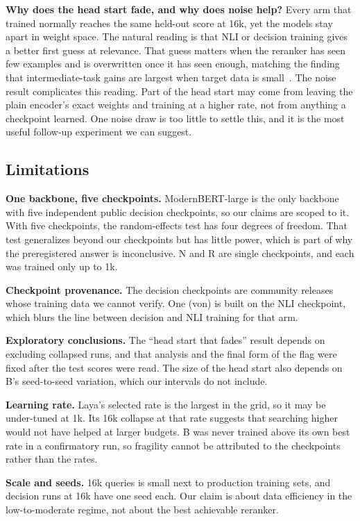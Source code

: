 \documentclass[journal]{IEEEtran}
\begin{document}
\textbf{Why does the head start fade, and why does noise help?} Every arm that trained normally reaches the same held-out score at 16k, yet the models stay apart in weight space. The natural reading is that NLI or decision training gives a better first guess at relevance. That guess matters when the reranker has seen few examples and is overwritten once it has seen enough, matching the finding that intermediate-task gains are largest when target data is small~\cite{phang2018stilts,pruksachatkun2020intermediate,mokrii2021transfer}. The noise result complicates this reading. Part of the head start may come from leaving the plain encoder's exact weights and training at a higher rate, not from anything a checkpoint learned. One noise draw is too little to settle this, and it is the most useful follow-up experiment we can suggest.

\subsection{Limitations}

\textbf{One backbone, five checkpoints.} ModernBERT-large is the only backbone with five independent public decision checkpoints, so our claims are scoped to it. With five checkpoints, the random-effects test has four degrees of freedom. That test generalizes beyond our checkpoints but has little power, which is part of why the preregistered answer is inconclusive. N and R are single checkpoints, and each was trained only up to 1k.

\textbf{Checkpoint provenance.} The decision checkpoints are community releases whose training data we cannot verify. One (von) is built on the NLI checkpoint, which blurs the line between decision and NLI training for that arm.

\textbf{Exploratory conclusions.} The ``head start that fades'' result depends on excluding collapsed runs, and that analysis and the final form of the flag were fixed after the test scores were read. The size of the head start also depends on B's seed-to-seed variation, which our intervals do not include.

\textbf{Learning rate.} Laya's selected rate is the largest in the grid, so it may be under-tuned at 1k. Its 16k collapse at that rate suggests that searching higher would not have helped at larger budgets. B was never trained above its own best rate in a confirmatory run, so fragility cannot be attributed to the checkpoints rather than the rates.

\textbf{Scale and seeds.} 16k queries is small next to production training sets, and decision runs at 16k have one seed each. Our claim is about data efficiency in the low-to-moderate regime, not about the best achievable reranker.
\end{document}
